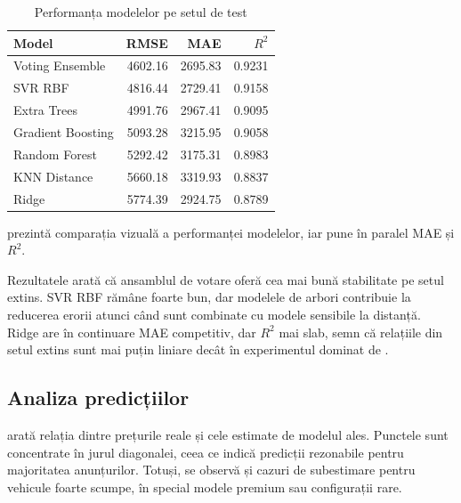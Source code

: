 \begin{table}[htb]
    \centering
    \caption{Performanța modelelor pe setul de test}
    \label{tab:model-results}
    \begin{tabular}{lrrr}
        \toprule
        Model & RMSE & MAE & \(R^2\) \\
        \midrule
        Voting Ensemble & 4602.16 & 2695.83 & 0.9231 \\
        SVR RBF & 4816.44 & 2729.41 & 0.9158 \\
        Extra Trees & 4991.76 & 2967.41 & 0.9095 \\
        Gradient Boosting & 5093.28 & 3215.95 & 0.9058 \\
        Random Forest & 5292.42 & 3175.31 & 0.8983 \\
        KNN Distance & 5660.18 & 3319.93 & 0.8837 \\
        Ridge & 5774.39 & 2924.75 & 0.8789 \\
        \bottomrule
    \end{tabular}
\end{table}

 prezintă comparația vizuală a performanței modelelor, iar  pune în paralel MAE și \(R^2\).



Rezultatele arată că ansamblul de votare oferă cea mai bună stabilitate pe setul extins. SVR RBF rămâne foarte bun, dar modelele de arbori contribuie la reducerea erorii atunci când sunt combinate cu modele sensibile la distanță. Ridge are în continuare MAE competitiv, dar \(R^2\) mai slab, semn că relațiile din setul extins sunt mai puțin liniare decât în experimentul dominat de \autovit.

\subsection{Analiza predicțiilor}
\label{sec:evaluation-predictions}

 arată relația dintre prețurile reale și cele estimate de modelul ales. Punctele sunt concentrate în jurul diagonalei, ceea ce indică predicții rezonabile pentru majoritatea anunțurilor. Totuși, se observă și cazuri de subestimare pentru vehicule foarte scumpe, în special modele premium sau configurații rare.

